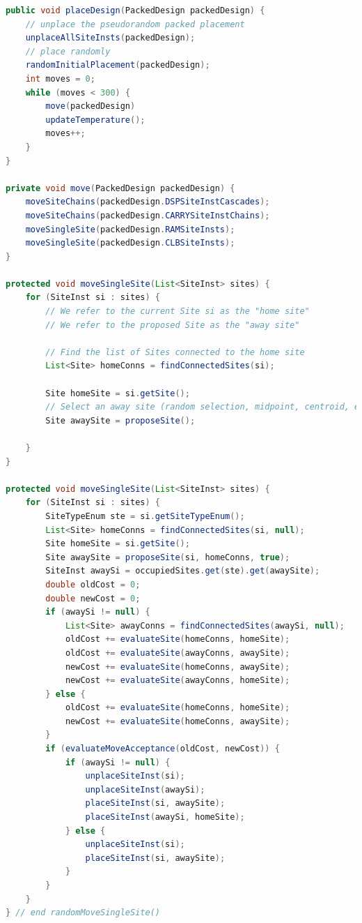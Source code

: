 \begin{lstlisting}[language=java, caption={Simulated Annealing pseudocode}, label={lst:sa_pseudocode}]
public void placeDesign(PackedDesign packedDesign) {
    // unplace the pseudorandom packed placement
    unplaceAllSiteInsts(packedDesign);
    // place randomly
    randomInitialPlacement(packedDesign);
    int moves = 0;
    while (moves < 300) {
        move(packedDesign)
        updateTemperature();
        moves++;
    }
}

private void move(PackedDesign packedDesign) {
    moveSiteChains(packedDesign.DSPSiteInstCascades);
    moveSiteChains(packedDesign.CARRYSiteInstChains);
    moveSingleSite(packedDesign.RAMSiteInsts);
    moveSingleSite(packedDesign.CLBSiteInsts);
}

protected void moveSingleSite(List<SiteInst> sites) {
    for (SiteInst si : sites) {
        // We refer to the current Site si as the "home site"
        // We refer to the proposed Site as the "away site"

        // Find the list of Sites connected to the home site
        List<Site> homeConns = findConnectedSites(si);

        Site homeSite = si.getSite();
        // Select an away site (random selection, midpoint, centroid, etc.)
        Site awaySite = proposeSite();

    }
}

protected void moveSingleSite(List<SiteInst> sites) {
    for (SiteInst si : sites) {
        SiteTypeEnum ste = si.getSiteTypeEnum();
        List<Site> homeConns = findConnectedSites(si, null);
        Site homeSite = si.getSite();
        Site awaySite = proposeSite(si, homeConns, true);
        SiteInst awaySi = occupiedSites.get(ste).get(awaySite);
        double oldCost = 0;
        double newCost = 0;
        if (awaySi != null) {
            List<Site> awayConns = findConnectedSites(awaySi, null);
            oldCost += evaluateSite(homeConns, homeSite);
            oldCost += evaluateSite(awayConns, awaySite);
            newCost += evaluateSite(homeConns, awaySite);
            newCost += evaluateSite(awayConns, homeSite);
        } else {
            oldCost += evaluateSite(homeConns, homeSite);
            newCost += evaluateSite(homeConns, awaySite);
        }
        if (evaluateMoveAcceptance(oldCost, newCost)) {
            if (awaySi != null) {
                unplaceSiteInst(si);
                unplaceSiteInst(awaySi);
                placeSiteInst(si, awaySite);
                placeSiteInst(awaySi, homeSite);
            } else {
                unplaceSiteInst(si);
                placeSiteInst(si, awaySite);
            }
        }
    }
} // end randomMoveSingleSite()
\end{lstlisting}


